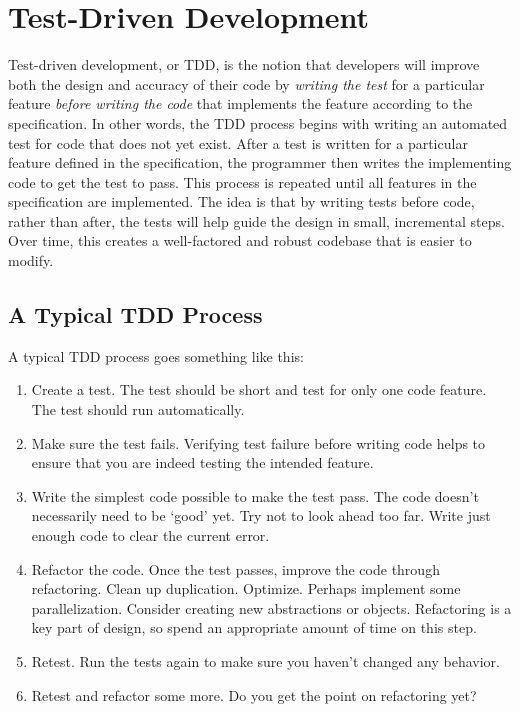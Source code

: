 \section{Test-Driven Development}
Test-driven development, or TDD, is the notion that developers will improve both the design and
accuracy of their code by \textit{writing the test} for a particular feature \textit{before writing the 
code} that implements the feature according to the specification. In other words, the TDD process 
begins with writing an automated test for code that does not yet 
exist. After a test is written for a particular feature defined in the specification, the 
programmer then writes the implementing code to get the test to pass. This process is repeated until
all features in the specification are implemented.  
The idea is that by writing tests before code, rather than after, the tests will help guide
the design in small, incremental steps. Over time, this creates a well-factored and robust
codebase that is easier to modify.

\subsection{A Typical TDD Process}\label{tdd-classic}

A typical TDD process goes something like this:
\begin{enumerate}
\item Create a test. The test should be short and test for only one code feature. The test
  should run automatically.
\item Make sure the test fails. Verifying test failure before writing code helps to ensure
  that you are indeed testing the intended feature.
\item Write the simplest code possible to make the test pass. The code doesn't necessarily 
  need to be `good' yet.  Try not to look ahead too far. Write just enough code to clear 
  the current error.
\item Refactor the code. Once the test passes, improve the code through refactoring. 
  Clean up duplication. Optimize. Perhaps implement some parallelization. Consider creating new abstractions or
  objects.  Refactoring is a key part of design, so spend an appropriate amount of time on this step.
\item Retest. Run the tests again to make sure you haven't changed any behavior.
\item Retest and refactor some more. Do you get the point on refactoring yet?
\end{enumerate}

